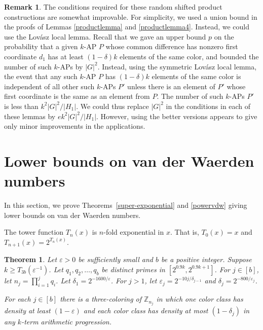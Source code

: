 \documentclass[11pt]{article}
\numberwithin{equation}{section}
\newtheorem{thm}{Theorem}
\theoremstyle{definition}
\newtheorem{rmk}[result]{Remark}
\theoremstyle{remark}
\begin{document}
\begin{rmk}
    The conditions required for these random shifted product constructions are somewhat improvable. For simplicity, we used a union bound in the proofs of Lemmas \ref{productlemma} and \ref{productlemma4}. Instead, we could use the Lov\'asz local lemma. Recall that we gave an upper bound $p$ on the probability that a given $k$-AP $P$ whose common difference has nonzero first coordinate $d_1$ has at least $(1-\delta)k$ elements of the same color, and bounded the number of such $k$-APs by $|G|^2$. Instead, using the symmetric Lov\'asz local lemma, the event that any such $k$-AP $P$ has $(1-\delta)k$ elements of the same color is independent of all other such $k$-APs $P'$ unless there is an element of $P'$ whose first coordinate is the same as an element from $P$. The number of such $k$-APs $P'$ is less than $k^2|G|^2/|H_1|$. We could thus replace $|G|^2$ in the conditions in each of these lemmas by $ek^2|G|^2/|H_1|$. However, using the better versions appears to give only minor improvements in the applications. 
\end{rmk}

\section{Lower bounds on van der Waerden numbers}
\label{section:vdw}
In this section, we prove Theorems~\ref{super-exponential} and \ref{powervdw} giving lower bounds on van der Waerden numbers.  

The tower function $T_n(x)$ is $n$-fold exponential in $x$. That is, $T_0(x)=x$ and $T_{n+1}(x)=2^{T_n(x)}$.  

\begin{thm}\label{firstkey}
Let $\varepsilon>0$ be sufficiently small and $b$ be a positive integer. Suppose $k \geq T_{3b}(\varepsilon^{-1})$.
Let $q_1,q_2,\ldots,q_b$ be distinct primes in $[2^{0.9k},2^{0.9k+1}]$. For $j \in [b]$, let $n_j=\prod_{i=1}^{j} q_i$. Let $\delta_1=2^{-1600/\varepsilon}$. For $j>1$, let $\varepsilon_j=2^{-10j/\delta_{j-1}}$ and $\delta_j=2^{-800/\varepsilon_j}$. 

For each $j \in [b]$ there is a three-coloring of $\mathbb{Z}_{n_j}$ in which one color class has density at least $(1-\varepsilon)$ and each color class has density at most $(1-\delta_j)$ in any $k$-term arithmetic progression. \end{thm}
\end{document}
